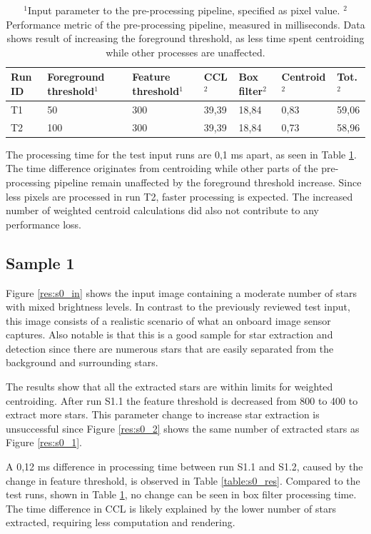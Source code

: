 \documentclass[12pt]{report}
\begin{document}
\begin{table}[!h]
    \centering
    \begin{tabular}{|p{0.8cm}|p{2.5cm}|p{2cm}||p{1.25cm}|p{1.25cm}|p{1.9cm}|p{1cm}|}
        \hline
        \textbf{Run ID}&\textbf{Foreground threshold$^{1}$}&\textbf{Feature threshold$^{1}$}&\textbf{CCL$^{2}$}&\textbf{Box filter$^{2}$}&\textbf{Centroid$^{2}$}&\textbf{Tot.$^{2}$}\\
        \hline
        \hline
        T1&50&300&39,39&18,84&0,83&59,06\\
        \hline
        T2&100&300&39,39&18,84&0,73&58,96\\
        \hline
    \end{tabular}
    \caption{$^{1}$Input parameter to the pre-processing pipeline, specified as pixel value. $^{2}$Performance metric of the pre-processing pipeline, measured in milliseconds. Data shows result of increasing the foreground threshold, as less time spent centroiding while other processes are unaffected.}
    \label{table:t_res}
\end{table}

The processing time for the test input runs are 0,1 ms apart, as seen in Table \ref{table:t_res}. The time difference originates from centroiding while other parts of the pre-processing pipeline remain unaffected by the foreground threshold increase. Since less pixels are processed in run T2, faster processing is expected. The increased number of weighted centroid calculations did also not contribute to any performance loss.

\subsection*{Sample 1}

Figure \ref{res:s0_in} shows the input image containing a moderate number of stars with mixed brightness levels. In contrast to the previously reviewed test input, this image consists of a realistic scenario of what an onboard image sensor captures. Also notable is that this is a good sample for star extraction and detection since there are numerous stars that are easily separated from the background and surrounding stars.
\par
The results show that all the extracted stars are within limits for weighted centroiding. After run S1.1 the feature threshold is decreased from 800 to 400 to extract more stars. This parameter change to increase star extraction is unsuccessful since Figure \ref{res:s0_2} shows the same number of extracted stars as Figure \ref{res:s0_1}.  
\par
A 0,12 ms difference in processing time between run S1.1 and S1.2, caused by the change in feature threshold, is observed in Table \ref{table:s0_res}. Compared to the test runs, shown in Table \ref{table:t_res}, no change can be seen in box filter processing time. The time difference in CCL is likely explained by the lower number of stars extracted, requiring less computation and rendering.
\end{document}
